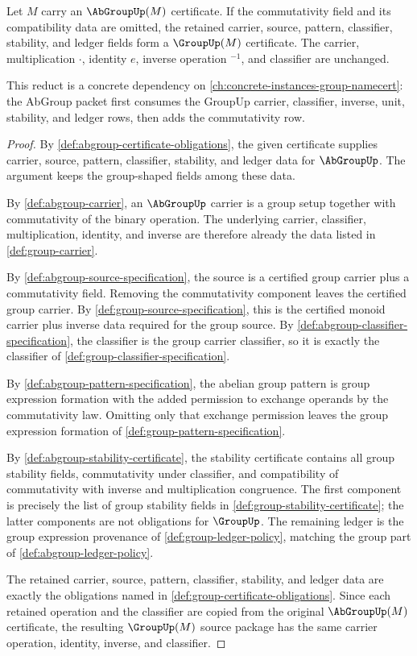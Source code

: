 \begin{proposition}
\label{prop:abgroup-forgets-group-certificate}
Let $M$ carry an $\AbGroupUp(M)$ certificate. If the commutativity field and its compatibility data are omitted, the retained carrier, source, pattern, classifier, stability, and ledger fields form a $\GroupUp(M)$ certificate. The carrier, multiplication $\cdot$, identity $e$, inverse operation ${}^{-1}$, and classifier are unchanged.
\end{proposition}
This reduct is a concrete dependency on \autoref{ch:concrete-instances-group-namecert}: the AbGroup packet first consumes the GroupUp carrier, classifier, inverse, unit, stability, and ledger rows, then adds the commutativity row.
\begin{proof}
By \autoref{def:abgroup-certificate-obligations}, the given certificate supplies carrier, source, pattern, classifier, stability, and ledger data for $\AbGroupUp$. The argument keeps the group-shaped fields among these data.

By \autoref{def:abgroup-carrier}, an $\AbGroupUp$ carrier is a group setup together with commutativity of the binary operation. The underlying carrier, classifier, multiplication, identity, and inverse are therefore already the data listed in \autoref{def:group-carrier}.

By \autoref{def:abgroup-source-specification}, the source is a certified group carrier plus a commutativity field. Removing the commutativity component leaves the certified group carrier. By \autoref{def:group-source-specification}, this is the certified monoid carrier plus inverse data required for the group source. By \autoref{def:abgroup-classifier-specification}, the classifier is the group carrier classifier, so it is exactly the classifier of \autoref{def:group-classifier-specification}.

By \autoref{def:abgroup-pattern-specification}, the abelian group pattern is group expression formation with the added permission to exchange operands by the commutativity law. Omitting only that exchange permission leaves the group expression formation of \autoref{def:group-pattern-specification}.

By \autoref{def:abgroup-stability-certificate}, the stability certificate contains all group stability fields, commutativity under classifier, and compatibility of commutativity with inverse and multiplication congruence. The first component is precisely the list of group stability fields in \autoref{def:group-stability-certificate}; the latter components are not obligations for $\GroupUp$. The remaining ledger is the group expression provenance of \autoref{def:group-ledger-policy}, matching the group part of \autoref{def:abgroup-ledger-policy}.

The retained carrier, source, pattern, classifier, stability, and ledger data are exactly the obligations named in \autoref{def:group-certificate-obligations}. Since each retained operation and the classifier are copied from the original $\AbGroupUp(M)$ certificate, the resulting $\GroupUp(M)$ source package has the same carrier operation, identity, inverse, and classifier.
\end{proof}
